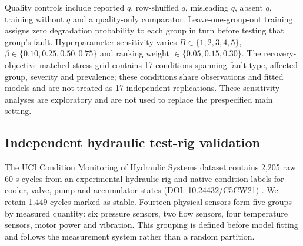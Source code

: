 \documentclass[11pt]{article}
\begin{document}
Quality controls include reported $q$, row-shuffled $q$, misleading $q$, absent $q$, training without $q$ and a quality-only comparator. Leave-one-group-out training assigns zero degradation probability to each group in turn before testing that group's fault. Hyperparameter sensitivity varies $B\in\{1,2,3,4,5\}$, $\beta\in\{0.10,0.25,0.50,0.75\}$ and ranking weight $\in\{0.05,0.15,0.30\}$. The recovery-objective-matched stress grid contains 17 conditions spanning fault type, affected group, severity and prevalence; these conditions share observations and fitted models and are not treated as 17 independent replications. These sensitivity analyses are exploratory and are not used to replace the prespecified main setting.

\subsection{Independent hydraulic test-rig validation}

The UCI Condition Monitoring of Hydraulic Systems dataset contains 2,205 raw 60-s cycles from an experimental hydraulic rig and native condition labels for cooler, valve, pump and accumulator states (DOI: \href{https://doi.org/10.24432/C5CW21}{10.24432/C5CW21}) \citep{helwig2018hydraulic,helwig2015condition}. We retain 1,449 cycles marked as stable. Fourteen physical sensors form five groups by measured quantity: six pressure sensors, two flow sensors, four temperature sensors, motor power and vibration. This grouping is defined before model fitting and follows the measurement system rather than a random partition.
\end{document}
